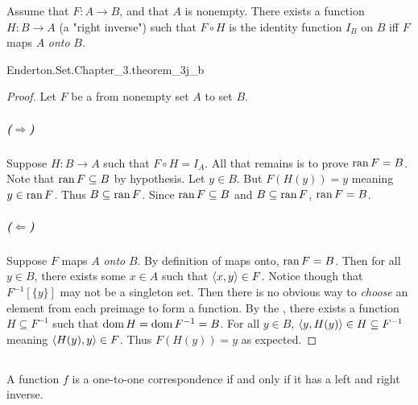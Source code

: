 \documentclass{report}
\begin{document}
  \begin{theorem}[3J(b)]
    Assume that $F \colon A \rightarrow B$, and that $A$ is nonempty.
    There exists a function $H \colon B \rightarrow A$ (a "right inverse") such
      that $F \circ H$ is the identity function $I_B$ on $B$ iff $F$ maps $A$
      \textit{onto} $B$.
  \end{theorem}

    {Enderton.Set.Chapter\_3.theorem\_3j\_b}

  \begin{proof}

    Let $F$ be a  from nonempty set $A$ to set $B$.

    \subparagraph{($\Rightarrow$)}%

      Suppose $H \colon B \rightarrow A$ such that $F \circ H = I_A$.
      All that remains is to prove $\mathop{\text{ran}}{F} = B$.
      Note that $\mathop{\text{ran}}{F} \subseteq B$ by hypothesis.
      Let $y \in B$.
      But $F(H(y)) = y$ meaning $y \in \mathop{\text{ran}}{F}$.
      Thus $B \subseteq \mathop{\text{ran}}{F}$.
      Since $\mathop{\text{ran}}{F} \subseteq B$ and $B \subseteq \mathop{\text{ran}}{F}$, $\mathop{\text{ran}}{F} = B$.

    \subparagraph{($\Leftarrow$)}%

      Suppose $F$ maps $A$ \textit{onto} $B$.
      By definition of maps onto, $\mathop{\text{ran}}{F} = B$.
      Then for all $y \in B$, there exists some $x \in A$ such that
        $\left< x, y \right> \in F$.
      Notice though that $F^{-1}[\{y\}]$ may not be a singleton set.
      Then there is no obvious way to \textit{choose} an element from each
        preimage to form a function.
      By the , there exists a function
        $H \subseteq F^{-1}$ such that $\mathop{\text{dom}}{H} = \mathop{\text{dom}}{F^{-1}} = B$.
      For all $y \in B$, $\left< y, H(y) \right> \in H \subseteq F^{-1}$
        meaning $\left< H(y), y \right> \in F$.
      Thus $F(H(y)) = y$ as expected.

  \end{proof}

\subsection{}%

  \begin{corollary}
    A function $f$ is a one-to-one correspondence if and only if it has a left
      and right inverse.
  \end{corollary}
\end{document}
